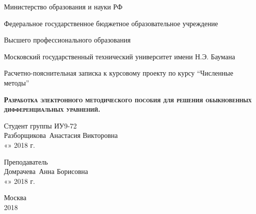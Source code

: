 \documentclass[14pt,russian]{extarticle}
\newcommand{\enq}[1]{\enquote{#1}}
\begin{document}
\sloppy

\def\figurename{Рисунок}

\begin{titlepage}
\thispagestyle{empty}
\newpage

\centerline{Министерство образования и науки РФ}
\centerline{Федеральное государственное бюджетное образовательное учреждение }
\centerline{Высшего профессионального образования}
\medskip 
\medskip 
\medskip
\centerline{Московский государственный технический университет имени Н.Э. Баумана}
 
\vspace{8em}
 
\begin{center}
\Large Расчетно-пояснительная записка к курсовому проекту по курсу \enq{Численные методы} \\
\end{center}
 
\begin{center}
\textsc{\textbf{Разработка электронного методического пособия для решения обыкновенных дифференциальных уравнений.}}
\end{center}
 
\vspace{\fill}
 

\newlength{\ML}

\hfill\begin{minipage}{0.7\textwidth}
  Студент группы ИУ9-72\\
  \underline{\hspace{\ML}} Разборщикова~Анастасия Викторовна\\
  «\underline{\hspace{0.7cm}}» \underline{\hspace{2cm}} 2018 г.
\end{minipage}%
\bigskip

\hfill\begin{minipage}{0.7\textwidth}
  Преподаватель\\
  \underline{\hspace{\ML}} Домрачева~Анна Борисовна\\
  «\underline{\hspace{0.7cm}}» \underline{\hspace{2cm}} 2018 г.
\end{minipage}%
\vfill

 


\begin{center}
Москва \\2018
\end{center}
\end{titlepage}
\end{document}
